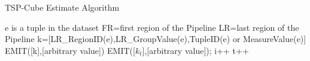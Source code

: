 



{\renewcommand\baselinestretch{1} 

\begin{algorithm}[htbp]
\caption{TSP-Cube Estimate Algorithm}
\label{tscube_mr1}
{\fontfamily{\familydefault}\selectfont

	\begin{algorithmic}[1] %
    	\State e is a tuple in the dataset
    		\State FR=first region of the Pipeline
    		\State LR=last region of the Pipeline
        	\State k=[LR\_RegionID(e),LR\_GroupValue(e),TupleID(e) or MeasureValue(e)]
        	\State EMIT([k],[arbitrary value])
        \EndFor
   	 \EndFunction
   	 \State
     		 \State	
     		 EMIT([${k}_{t}$],[arbitrary value]); i++
     		\EndIf
     		\State t++
     	\EndWhile
     \EndFunction
	\end{algorithmic}	
}
\end{algorithm}

\par}




